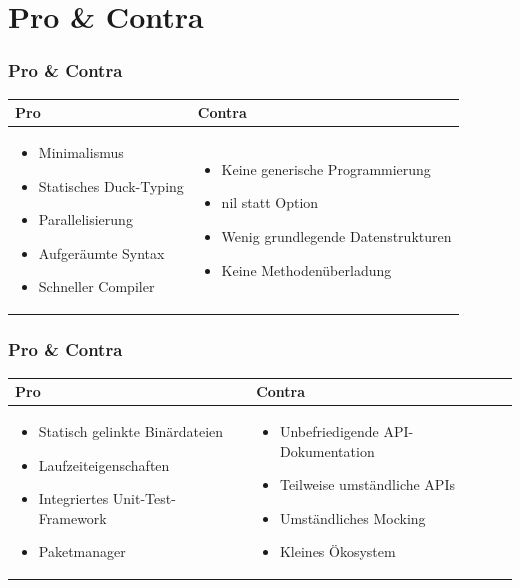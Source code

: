 \documentclass{beamer}
\begin{document}
\section{Pro \& Contra}
\begin{frame}
\frametitle{Pro \& Contra}

\begin{tabular}{p{5cm} | p{5.5cm}}
\textbf{Pro} & \textbf{Contra} \\ \hline
\begin{itemize}
\setlength{\itemsep}{20pt}
\item Minimalismus
\item Statisches Duck-Typing
\item Parallelisierung
\item Aufger\"aumte Syntax
\item Schneller Compiler
\end{itemize}
&
\begin{itemize}
\setlength{\itemsep}{20pt}
\item Keine generische Programmierung
\item nil statt Option
\item Wenig grundlegende Datenstrukturen
\item Keine Methodenüberladung
\end{itemize}
\\
\end{tabular}

\end{frame}

\begin{frame}
\frametitle{Pro \& Contra}

\begin{tabular}{p{5cm} | p{5.5cm}}
\textbf{Pro} & \textbf{Contra} \\ \hline
\begin{itemize}
\setlength{\itemsep}{20pt}
\item Statisch gelinkte Binärdateien
\item Laufzeiteigenschaften
\item Integriertes Unit-Test-Framework
\item Paketmanager
\end{itemize}
&
\begin{itemize}
\setlength{\itemsep}{20pt}
\item Unbefriedigende API-Dokumentation
\item Teilweise umständliche APIs
\item Umst\"andliches Mocking
\item Kleines \"Okosystem
\end{itemize}
\\
\end{tabular}

\end{frame}
\end{document}
